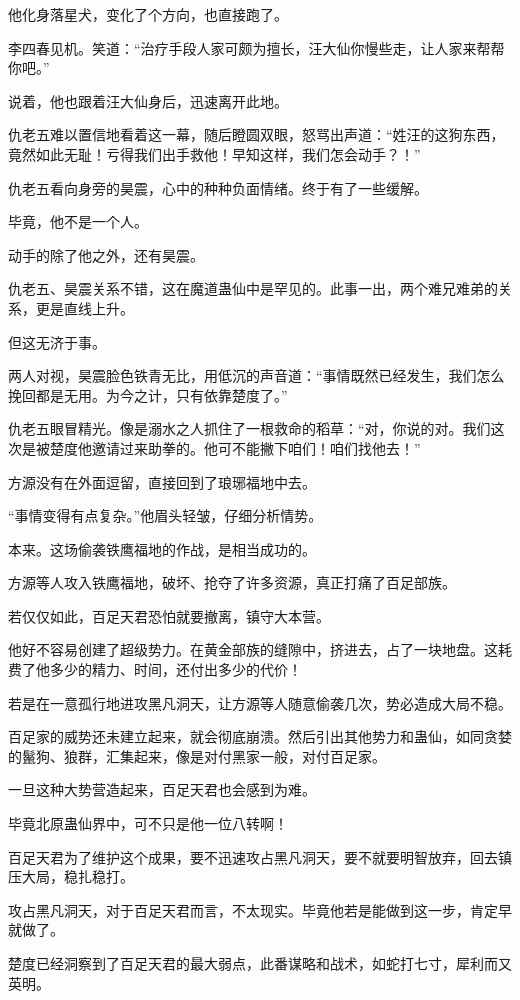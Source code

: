 \begin{this_body}
他化身落星犬，变化了个方向，也直接跑了。

李四春见机。笑道：“治疗手段人家可颇为擅长，汪大仙你慢些走，让人家来帮帮你吧。”

说着，他也跟着汪大仙身后，迅速离开此地。

仇老五难以置信地看着这一幕，随后瞪圆双眼，怒骂出声道：“姓汪的这狗东西，竟然如此无耻！亏得我们出手救他！早知这样，我们怎会动手？！”

仇老五看向身旁的昊震，心中的种种负面情绪。终于有了一些缓解。

毕竟，他不是一个人。

动手的除了他之外，还有昊震。

仇老五、昊震关系不错，这在魔道蛊仙中是罕见的。此事一出，两个难兄难弟的关系，更是直线上升。

但这无济于事。

两人对视，昊震脸色铁青无比，用低沉的声音道：“事情既然已经发生，我们怎么挽回都是无用。为今之计，只有依靠楚度了。”

仇老五眼冒精光。像是溺水之人抓住了一根救命的稻草：“对，你说的对。我们这次是被楚度他邀请过来助拳的。他可不能撇下咱们！咱们找他去！”

方源没有在外面逗留，直接回到了琅琊福地中去。

“事情变得有点复杂。”他眉头轻皱，仔细分析情势。

本来。这场偷袭铁鹰福地的作战，是相当成功的。

方源等人攻入铁鹰福地，破坏、抢夺了许多资源，真正打痛了百足部族。

若仅仅如此，百足天君恐怕就要撤离，镇守大本营。

他好不容易创建了超级势力。在黄金部族的缝隙中，挤进去，占了一块地盘。这耗费了他多少的精力、时间，还付出多少的代价！

若是在一意孤行地进攻黑凡洞天，让方源等人随意偷袭几次，势必造成大局不稳。

百足家的威势还未建立起来，就会彻底崩溃。然后引出其他势力和蛊仙，如同贪婪的鬣狗、狼群，汇集起来，像是对付黑家一般，对付百足家。

一旦这种大势营造起来，百足天君也会感到为难。

毕竟北原蛊仙界中，可不只是他一位八转啊！

百足天君为了维护这个成果，要不迅速攻占黑凡洞天，要不就要明智放弃，回去镇压大局，稳扎稳打。

攻占黑凡洞天，对于百足天君而言，不太现实。毕竟他若是能做到这一步，肯定早就做了。

楚度已经洞察到了百足天君的最大弱点，此番谋略和战术，如蛇打七寸，犀利而又英明。


\end{this_body}
